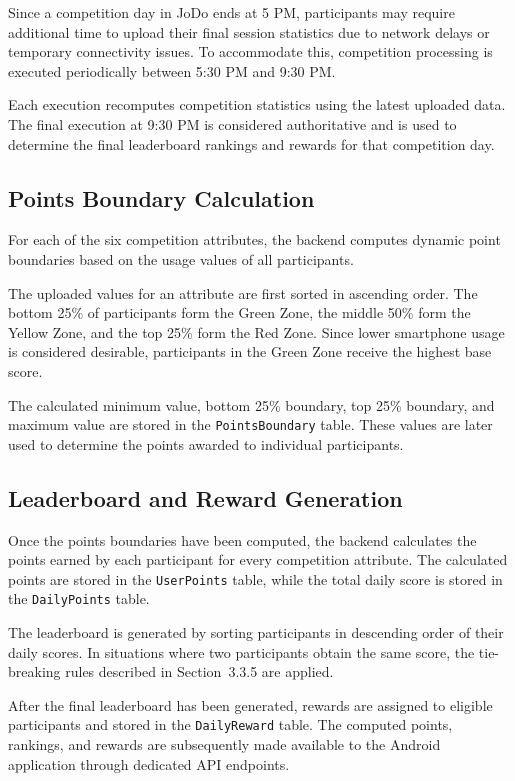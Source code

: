 \documentclass[11pt]{report}
\begin{document}
Since a competition day in JoDo ends at 5 PM, participants may require additional
time to upload their final session statistics due to network delays or temporary
connectivity issues. To accommodate this, competition processing is executed
periodically between 5:30 PM and 9:30 PM.

Each execution recomputes competition statistics using the latest uploaded data.
The final execution at 9:30 PM is considered authoritative and is used to determine
the final leaderboard rankings and rewards for that competition day.

\subsection{Points Boundary Calculation}

For each of the six competition attributes, the backend computes dynamic point
boundaries based on the usage values of all participants.

The uploaded values for an attribute are first sorted in ascending order. The
bottom 25\% of participants form the Green Zone, the middle 50\% form the Yellow
Zone, and the top 25\% form the Red Zone. Since lower smartphone usage is
considered desirable, participants in the Green Zone receive the highest base score.

The calculated minimum value, bottom 25\% boundary, top 25\% boundary, and
maximum value are stored in the \texttt{PointsBoundary} table. These values are
later used to determine the points awarded to individual participants.

\subsection{Leaderboard and Reward Generation}

Once the points boundaries have been computed, the backend calculates the points
earned by each participant for every competition attribute. The calculated points
are stored in the \texttt{UserPoints} table, while the total daily score is stored
in the \texttt{DailyPoints} table.

The leaderboard is generated by sorting participants in descending order of their
daily scores. In situations where two participants obtain the same score, the
tie-breaking rules described in Section~3.3.5 are applied.

After the final leaderboard has been generated, rewards are assigned to eligible
participants and stored in the \texttt{DailyReward} table. The computed points,
rankings, and rewards are subsequently made available to the Android application
through dedicated API endpoints.
\end{document}
